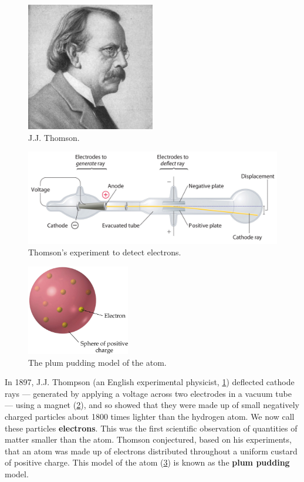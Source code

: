 \documentclass[a4paper]{amsbook}
\theoremstyle{definition}
\numberwithin{exercise}{chapter}
\numberwithin{exercise}{chapter}
\begin{document}
\begin{figure}
  \centering
  \includegraphics[width=0.5\textwidth]{thomson}
  \caption{J.J. Thomson. \label{fig:thomson}}
\end{figure}
\begin{figure}
  \centering
  \includegraphics[width=\textwidth]{crt}
  \caption{Thomson's experiment to detect electrons. \label{fig:crt}}
\end{figure}
\begin{figure}
  \centering
  \includegraphics[width=0.4\textwidth]{pudding}
  \caption{The plum pudding model of the atom. \label{fig:pudding}}
\end{figure}
In 1897, J.J. Thompson (an English experimental physicist, \cref{fig:thomson}) deflected cathode rays --- generated by applying a
voltage across two electrodes in a vacuum tube --- using a magnet (\cref{fig:crt}), and so showed that they were made up of small
negatively charged particles about 1800 times lighter than the hydrogen atom. We now call these particles \textbf{electrons}. This
was the first scientific observation of quantities of matter smaller than the atom. Thomson conjectured, based on his experiments,
that an atom was made up of electrons distributed throughout a uniform custard of positive charge. This model of the atom (\cref{fig:pudding})
is known as the \textbf{plum pudding} model.
\end{document}
